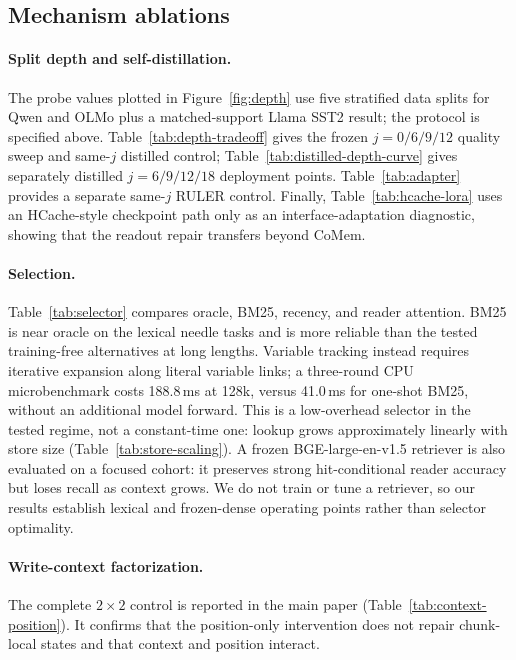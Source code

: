 \subsection{Mechanism ablations}
\label{app:ablations}

\paragraph{Split depth and self-distillation.}
The probe values plotted in Figure~\ref{fig:depth} use five stratified data
splits for Qwen and OLMo plus a matched-support Llama SST2 result; the protocol
is specified above. Table~\ref{tab:depth-tradeoff} gives the frozen
$j=0/6/9/12$ quality sweep and same-$j$ distilled control;
Table~\ref{tab:distilled-depth-curve} gives separately distilled
$j=6/9/12/18$ deployment points. Table~\ref{tab:adapter} provides a separate
same-$j$ RULER control.
Finally, Table~\ref{tab:hcache-lora} uses an HCache-style checkpoint path only
as an interface-adaptation diagnostic, showing that the readout repair transfers
beyond CoMem.






\paragraph{Selection.}
Table~\ref{tab:selector} compares oracle, BM25, recency, and reader attention.
BM25 is near oracle on the lexical needle tasks and is more reliable than the
tested training-free alternatives at long lengths. Variable tracking instead
requires iterative expansion along literal variable links; a three-round CPU
microbenchmark costs 188.8\,ms at 128k, versus 41.0\,ms for one-shot BM25, without
an additional model forward. This is a low-overhead selector in the tested
regime, not a constant-time one: lookup grows approximately linearly with store
size (Table~\ref{tab:store-scaling}). A frozen BGE-large-en-v1.5 retriever is
also evaluated on a focused cohort: it preserves strong hit-conditional reader
accuracy but loses recall as context grows. We do not train or tune a retriever,
so our results establish lexical and frozen-dense operating points rather than
selector optimality.




\paragraph{Write-context factorization.}
The complete $2{\times}2$ control is reported in the main paper
(Table~\ref{tab:context-position}). It confirms that the position-only
intervention does not repair chunk-local states and that context and position
interact.


